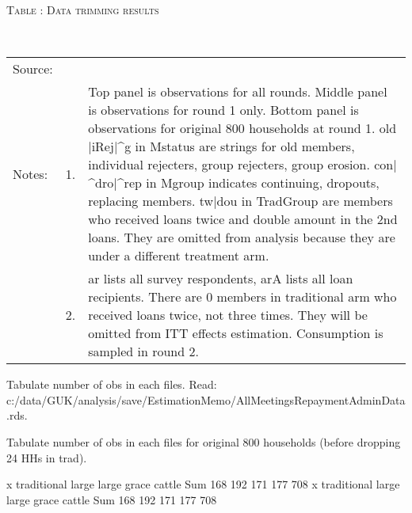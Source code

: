 \hspace{-1cm}\begin{minipage}[t]{14cm}
\hfil\textsc{\normalsize Table \thetable: Data trimming results\label{tab trim}}\\
\setlength{\tabcolsep}{1pt}
\setlength{\baselineskip}{8pt}
\renewcommand{\arraystretch}{.48}
\hfil{}\\
\renewcommand{\arraystretch}{.8}
\setlength{\tabcolsep}{1pt}
\begin{tabular}{>{\hfill\scriptsize}p{1cm}<{}>{\hfill\scriptsize}p{.25cm}<{}>{\scriptsize}p{12cm}<{\hfill}}
Source:& \multicolumn{2}{l}{\scriptsize GUK survey data.}\\
Notes: & 1. & Top panel is observations for all rounds. Middle panel is observations for round 1 only. Bottom panel is observations for original 800 households at round 1. old$|$iRej$|$\^{}g in \textsf{Mstatus} are strings for old members, individual rejecters, group rejecters, group erosion. con$|$\^{}dro$|$\^{}rep in \textsf{Mgroup} indicates continuing, dropouts, replacing members. tw$|$dou in \textsf{TradGroup} are members who received loans twice and double amount in the 2nd loans. They are omitted from analysis because they are under a different treatment arm. \\
& 2. & \textsf{ar} lists all survey respondents, \textsf{arA} lists all loan recipients. There are 0 members in \textsf{traditional} arm who received loans twice, not three times. They will be omitted from ITT effects estimation. Consumption is sampled in round 2.
\end{tabular}
\end{minipage}


Tabulate number of obs in each files. Read: c:/data/GUK/analysis/save/EstimationMemo/AllMeetingsRepaymentAdminData.rds.

Tabulate number of obs in each files for original 800 households (before dropping 24 HHs in trad). 
\begin{Schunk}
\begin{Soutput}
x
traditional       large large grace      cattle         Sum 
        168         192         171         177         708 
x
traditional       large large grace      cattle         Sum 
        168         192         171         177         708 
\end{Soutput}
\end{Schunk}

